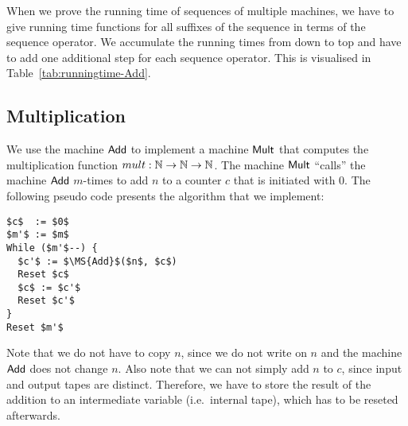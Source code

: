 When we prove the running time of sequences of multiple machines, we have to give running time functions for all suffixes of the sequence in terms of the
sequence operator.  We accumulate the running times from down to top and have to add one additional step for each sequence operator.  This is visualised in
Table~\ref{tab:runningtime-Add}.


\subsection{Multiplication}
\label{sec:Mult}

We use the machine $\mathsf{Add}$ to implement a machine $\mathsf{Mult}$ that computes the multiplication function $mult : \mathbb{N}\rightarrow\mathbb{N}\rightarrow\mathbb{N}$.  The machine
$\mathsf{Mult}$ ``calls'' the machine $\mathsf{Add}$ $m$-times to add $n$ to a counter $c$ that is initiated with $0$.  The following pseudo code presents the
algorithm that we implement: { \small
\begin{lstlisting}[style=pseudocode]
$c$  := $0$
$m'$ := $m$
While ($m'$--) {
  $c'$ := $\MS{Add}$($n$, $c$)
  Reset $c$
  $c$ := $c'$
  Reset $c'$
}
Reset $m'$
\end{lstlisting}
}%
Note that we do not have to copy $n$, since we do not write on $n$ and the machine $\mathsf{Add}$ does not change
$n$.  Also note that we can not simply add $n$ to $c$, since input and output tapes are distinct.  Therefore, we have to store the result of the
addition to an intermediate variable (i.e.\ internal tape), which has to be reseted afterwards.

